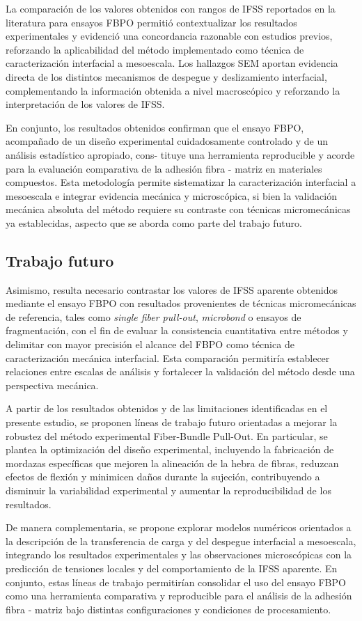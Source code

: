 La comparación de los valores obtenidos con rangos de IFSS reportados en la literatura para ensayos
FBPO permitió contextualizar los resultados experimentales y evidenció una concordancia razonable 
con estudios previos, reforzando la aplicabilidad del método implementado como técnica de
caracterización interfacial a mesoescala. Los hallazgos SEM aportan evidencia directa de los
distintos mecanismos de despegue y deslizamiento interfacial, complementando la información
obtenida a nivel macroscópico y reforzando la interpretación de los valores de IFSS.

En conjunto, los resultados obtenidos confirman que el ensayo FBPO, acompañado de un diseño
experimental cuidadosamente controlado y de un análisis estadístico apropiado, cons- tituye una
herramienta reproducible y acorde para la evaluación comparativa de la adhesión fibra - matriz
en materiales compuestos. Esta metodología permite sistematizar la caracterización interfacial
a mesoescala e integrar evidencia mecánica y microscópica, si bien la validación mecánica
absoluta del método requiere su contraste con técnicas micromecánicas ya establecidas, aspecto
que se aborda como parte del trabajo futuro.

\clearpage
\subsection{Trabajo futuro}

Asimismo, resulta necesario contrastar los valores de IFSS aparente obtenidos mediante el
ensayo FBPO con resultados provenientes de técnicas micromecánicas de referencia, tales como
\textit{single fiber pull-out}, \textit{microbond} o ensayos de fragmentación, con el fin de
evaluar la consistencia cuantitativa entre métodos y delimitar con mayor precisión el alcance
del FBPO como técnica de caracterización mecánica interfacial. Esta comparación permitiría
establecer relaciones entre escalas de análisis y fortalecer la validación del método desde una
perspectiva mecánica.

A partir de los resultados obtenidos y de las limitaciones identificadas en el presente estudio,
se proponen líneas de trabajo futuro orientadas a mejorar la robustez del método experimental
Fiber-Bundle Pull-Out. En particular, se plantea la optimización del diseño experimental,
incluyendo la fabricación de mordazas específicas que mejoren la alineación de la hebra de fibras,
reduzcan efectos de flexión y minimicen daños durante la sujeción, contribuyendo a disminuir la
variabilidad experimental y aumentar la reproducibilidad de los resultados.

De manera complementaria, se propone explorar modelos numéricos orientados a la descripción de
la transferencia de carga y del despegue interfacial a mesoescala, integrando los resultados
experimentales y las observaciones microscópicas con la predicción de tensiones locales y del
comportamiento de la IFSS aparente. En conjunto, estas líneas de trabajo permitirían consolidar
el uso del ensayo FBPO como una herramienta comparativa y reproducible para el análisis de la
adhesión fibra - matriz bajo distintas configuraciones y condiciones de procesamiento.
